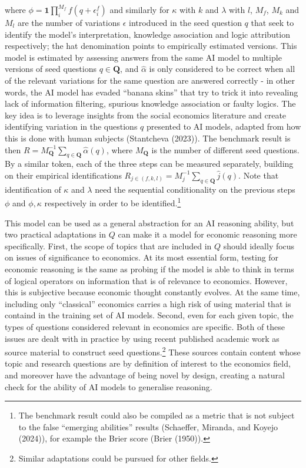 \documentclass[
]{article}
\theoremstyle{plain}
\theoremstyle{definition}
\theoremstyle{remark}
\begin{document}
where \(\phi = \mathbf{1} \prod_{i}^{M_f} f(q + \epsilon_i^f)\) and
similarly for \(\kappa\) with \(k\) and \(\lambda\) with \(l\), \(M_f\),
\(M_k\) and \(M_l\) are the number of variations \(\epsilon\) introduced
in the seed question \(q\) that seek to identify the model's
interpretation, knowledge association and logic attribution
respectively; the hat denomination points to empirically estimated
versions. This model is estimated by assessing answers from the same AI
model to multiple versions of seed questions \(q \in \mathbf{Q}\), and
\(\hat{\alpha}\) is only considered to be correct when all of the
relevant variations for the same question are answered correctly - in
other words, the AI model has evaded ``banana skins'' that try to trick
it into revealing lack of information filtering, spurious knowledge
association or faulty logics. The key idea is to leverage insights from
the social economics literature and create identifying variation in the
questions \(q\) presented to AI models, adapted from how this is done
with human subjects (Stantcheva (2023)). The benchmark result is then
\(R = M_{\mathbf{Q}}^{-1}\sum_{q \in \mathbf{Q}} \hat{\alpha}(q)\),
where \(M_{\mathbf{Q}}\) is the number of different seed questions. By a
similar token, each of the three steps can be measured separately,
building on their empirical identifications
\(R_{j \in (f, k, l)} = M_{j}^{-1}\sum_{q \in \mathbf{Q}} \hat{j}(q)\).
Note that identification of \(\kappa\) and \(\lambda\) need the
sequential conditionality on the previous steps \(\phi\) and
\(\phi, \kappa\) respectively in order to be identified.\footnote{The
  benchmark result could also be compiled as a metric that is not
  subject to the false ``emerging abilities'' results (Schaeffer,
  Miranda, and Koyejo (2024)), for example the Brier score (Brier
  (1950)).}

This model can be used as a general abstraction for an AI reasoning
ability, but two practical adaptations in \(Q\) can make it a model for
economic reasoning more specifically. First, the scope of topics that
are included in \(Q\) should ideally focus on issues of significance to
economics. At its most essential form, testing for economic reasoning is
the same as probing if the model is able to think in terms of logical
operators on information that is of relevance to economics. However,
this is subjective because economic thought constantly evolves. At the
same time, including only ``classical'' economics carries a high risk of
using material that is containd in the training set of AI models.
Second, even for each given topic, the types of questions considered
relevant in economics are specific. Both of these issues are dealt with
in practice by using recent published academic work as source material
to construct seed questions.\footnote{Similar adaptations could be
  pursued for other fields.} These sources contain content whose topic
and research questions are by definition of interest to the economics
field, and moreover have the advantage of being novel by design,
creating a natural check for the ability of AI models to generalise
reasoning.
\end{document}

